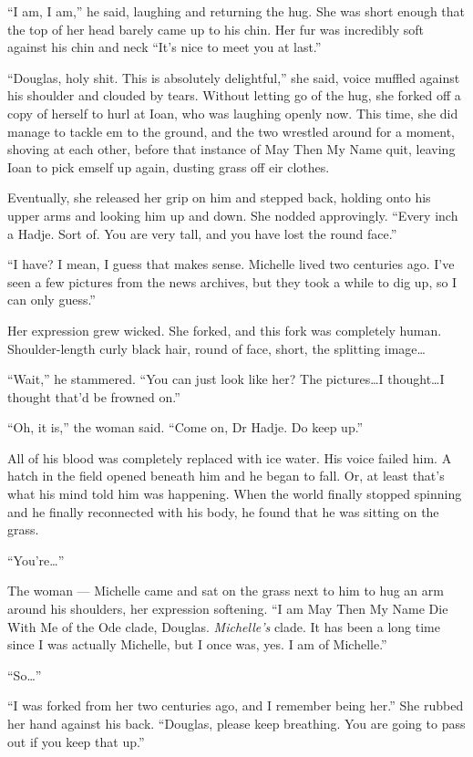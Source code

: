 ``I am, I am,'' he said, laughing and returning the hug. She was short enough that the top of her head barely came up to his chin. Her fur was incredibly soft against his chin and neck ``It's nice to meet you at last.''

``Douglas, holy shit. This is absolutely delightful,'' she said, voice muffled against his shoulder and clouded by tears. Without letting go of the hug, she forked off a copy of herself to hurl at Ioan, who was laughing openly now. This time, she did manage to tackle em to the ground, and the two wrestled around for a moment, shoving at each other, before that instance of May Then My Name quit, leaving Ioan to pick emself up again, dusting grass off eir clothes.

Eventually, she released her grip on him and stepped back, holding onto his upper arms and looking him up and down. She nodded approvingly. ``Every inch a Hadje. Sort of. You are very tall, and you have lost the round face.''

``I have? I mean, I guess that makes sense. Michelle lived two centuries ago. I've seen a few pictures from the news archives, but they took a while to dig up, so I can only guess.''

Her expression grew wicked. She forked, and this fork was completely human. Shoulder-length curly black hair, round of face, short, the splitting image\ldots{}

``Wait,'' he stammered. ``You can just look like her? The pictures\ldots I thought\ldots I thought that'd be frowned on.''

``Oh, it is,'' the woman said. ``Come on, Dr Hadje. Do keep up.''

All of his blood was completely replaced with ice water. His voice failed him. A hatch in the field opened beneath him and he began to fall. Or, at least that's what his mind told him was happening. When the world finally stopped spinning and he finally reconnected with his body, he found that he was sitting on the grass.

``You're\ldots{}''

The woman — Michelle came and sat on the grass next to him to hug an arm around his shoulders, her expression softening. ``I am May Then My Name Die With Me of the Ode clade, Douglas. \emph{Michelle's} clade. It has been a long time since I was actually Michelle, but I once was, yes. I am of Michelle.''

``So\ldots{}''

``I was forked from her two centuries ago, and I remember being her.'' She rubbed her hand against his back. ``Douglas, please keep breathing. You are going to pass out if you keep that up.''

